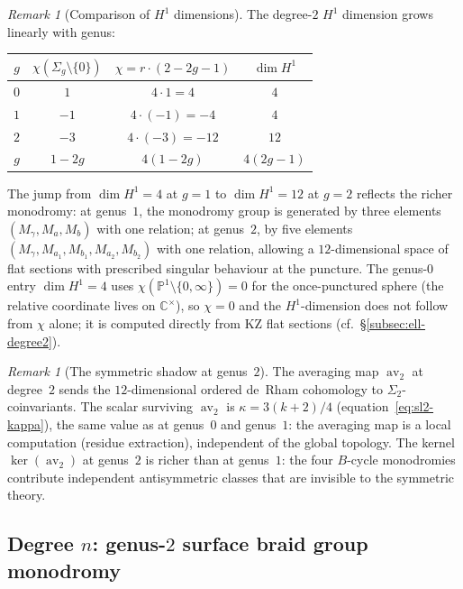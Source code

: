 \documentclass[11pt,reqno]{amsart}
\theoremstyle{definition}
\theoremstyle{remark}
\newtheorem{remark}[theorem]{Remark}
\DeclareMathOperator{\av}{av}
\newcommand{\CC}{\mathbb{C}}
\newcommand{\PP}{\mathbb{P}}
\numberwithin{equation}{section}
\begin{document}
\begin{remark}[Comparison of $H^1$ dimensions]
\label{rem:h1-comparison}
The degree-$2$ $H^1$ dimension grows linearly with genus:
\begin{center}
\renewcommand{\arraystretch}{1.2}
\begin{tabular}{@{} c c c c @{}}
  \toprule
  $g$ & $\chi({\Sigma_g \setminus \{0\}})$ &
  $\chi = r \cdot (2 - 2g - 1)$ & $\dim H^1$ \\
  \midrule
  $0$ & $1$ & $4 \cdot 1 = 4$ & $4$ \\
  $1$ & $-1$ & $4 \cdot (-1) = -4$ & $4$ \\
  $2$ & $-3$ & $4 \cdot (-3) = -12$ & $12$ \\
  $g$ & $1 - 2g$ & $4(1 - 2g)$ & $4(2g - 1)$ \\
  \bottomrule
\end{tabular}
\end{center}
The jump from $\dim H^1 = 4$ at $g = 1$ to $\dim H^1 = 12$
at $g = 2$ reflects the richer monodromy: at genus~$1$, the
monodromy group is generated by three elements
$(M_\gamma, M_a, M_b)$ with one relation; at genus~$2$,
by five elements $(M_\gamma, M_{a_1}, M_{b_1}, M_{a_2},
M_{b_2})$ with one relation, allowing a $12$-dimensional
space of flat sections with prescribed singular behaviour at
the puncture. The genus-$0$ entry $\dim H^1 = 4$ uses
$\chi(\PP^1 \setminus \{0, \infty\}) = 0$ for the
once-punctured sphere (the relative coordinate lives on
$\CC^\times$), so
$\chi = 0$ and the $H^1$-dimension does not follow from
$\chi$ alone; it is computed directly from KZ flat sections
\textup{(}cf.\ \S\ref{subsec:ell-degree2}\textup{)}.
\end{remark}

\begin{remark}[The symmetric shadow at genus~$2$]
\label{rem:g2-shadow}
The averaging map $\av_2$ at degree~$2$ sends the
$12$-dimensional ordered de~Rham cohomology to
$\Sigma_2$-coinvariants. The scalar surviving $\av_2$ is
$\kappa = 3(k+2)/4$
(equation~\eqref{eq:sl2-kappa}), the same value as at
genus~$0$ and genus~$1$: the averaging map is a local
computation (residue extraction), independent of the global
topology.
The kernel $\ker(\av_2)$ at genus~$2$ is richer than at
genus~$1$: the four $B$-cycle monodromies contribute
independent antisymmetric classes that are invisible to the
symmetric theory.
\end{remark}

\subsection{Degree $n$: genus-$2$ surface braid group
monodromy}
\label{subsec:g2-degree-n}
\end{document}
